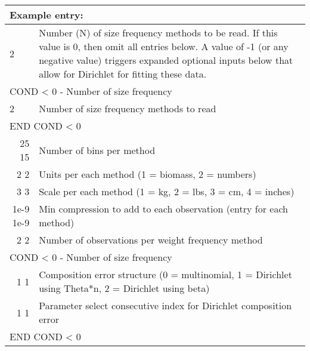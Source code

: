 \begin{center}
	\begin{tabular}{p{1.4cm} p{0.7cm} p{12.8 cm}}
		\multicolumn{3}{l}{Example entry:} \\
		\hline
		2 & & Number (N) of size frequency methods to be read. If this value is 0, then omit all entries below. A value of -1 (or any negative value) triggers expanded optional inputs below that allow for Dirichlet 
		for fitting these data. \Tstrut\Bstrut\\
		\hline
		\multicolumn{3}{l}{COND < 0 - Number of size frequency} \Tstrut\\
		\multicolumn{2}{l}{2} & Number of size frequency methods to read \Tstrut\\
		\multicolumn{3}{l}{END COND < 0} \Bstrut\\
		\hline
		\multicolumn{2}{r}{25 15} & Number of bins per method \Tstrut\\
		\multicolumn{2}{r}{2 2} & Units per each method (1 = biomass, 2 = numbers) \\
		\multicolumn{2}{r}{3 3} & Scale per each method (1 = kg, 2 = lbs, 3 = cm, 4 = inches) \\
		\multicolumn{2}{r}{1e-9 1e-9} & Min compression to add to each observation (entry for each method) \\
		\multicolumn{2}{r}{2 2} & Number of observations per weight frequency method \Bstrut\\
		\hline
		\multicolumn{3}{l}{COND < 0 - Number of size frequency} \Tstrut\\
		\multicolumn{2}{r}{1 1} & Composition error structure (0 = multinomial, 1 = Dirichlet using Theta*n, 2 = Dirichlet using beta) \Tstrut\\
		\multicolumn{2}{r}{1 1} & Parameter select consecutive index for Dirichlet 
		composition error \Bstrut\\
		\multicolumn{3}{l}{END COND < 0} \Tstrut\\
		\hline
	\end{tabular}
	\leavevmode\tagmcend\tagstructend\par
\end{center}

